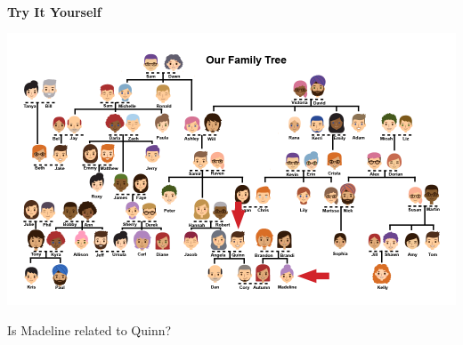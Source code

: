 \documentclass{ximera}
\begin{document}
\quad \\
\quad \\




\begin{example}
\quad \\
\textbf{Try It Yourself}

\begin{image}
\includegraphics{pics/Madeline_Quinn_arrow.png}
\end{image}

Is Madeline related to Quinn?
\begin{multipleChoice}
\end{multipleChoice}

\end{example}
\end{document}
